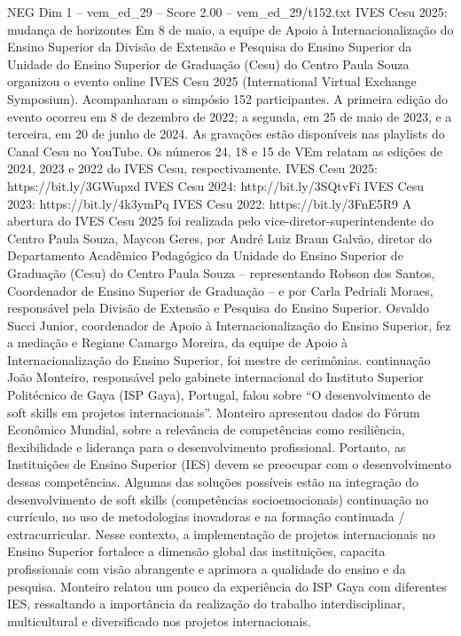 \begin{textsample}{NEG Dim 1 – vem\_ed\_29 – Score 2.00 – vem\_ed\_29/t152.txt}  \label{ex:f1_neg_083}
IVES Cesu 2025: mudança de horizontes Em 8 de maio, a equipe de Apoio à Internacionalização do Ensino Superior da Divisão de Extensão e Pesquisa do Ensino Superior da Unidade do Ensino Superior de Graduação (Cesu) do Centro Paula Souza organizou o evento online IVES Cesu 2025 (International Virtual Exchange Symposium).
Acompanharam o simpósio 152 participantes.
A primeira edição do evento ocorreu em 8 de dezembro de 2022; a segunda, em 25 de maio de 2023, e a terceira, em 20 de junho de 2024.
As gravações estão disponíveis nas playlists do Canal Cesu no YouTube.
Os números 24, 18 e 15 de VEm relatam as edições de 2024, 2023 e 2022 do IVES Cesu, respectivamente.
IVES Cesu 2025: https://bit.ly/3GWupxd IVES Cesu 2024: http://bit.ly/3SQtvFi IVES Cesu 2023: https://bit.ly/4k3ymPq IVES Cesu 2022: https://bit.ly/3FnE5R9 A abertura do IVES Cesu 2025 foi realizada pelo vice-diretor-superintendente do Centro Paula Souza, Maycon Geres, por André Luiz Braun Galvão, diretor do Departamento Acadêmico Pedagógico da Unidade do Ensino Superior de Graduação (Cesu) do Centro Paula Souza – representando Robson dos Santos, Coordenador de Ensino Superior de Graduação – e por Carla Pedriali Moraes, responsável pela Divisão de Extensão e Pesquisa do Ensino Superior.
Osvaldo Succi Junior, coordenador de Apoio à Internacionalização do Ensino Superior, fez a mediação e Regiane Camargo Moreira, da equipe de Apoio à Internacionalização do Ensino Superior, foi mestre de cerimônias. continuação João Monteiro, responsável pelo gabinete internacional do Instituto Superior Politécnico de Gaya (ISP Gaya), Portugal, falou sobre “O desenvolvimento de soft skills em projetos internacionais”.
Monteiro apresentou dados do Fórum Econômico Mundial, sobre a relevância de competências como resiliência, flexibilidade e liderança para o desenvolvimento profissional.
Portanto, as Instituições de Ensino Superior (IES) devem se preocupar com o desenvolvimento dessas competências.
Algumas das soluções possíveis estão na integração do desenvolvimento de soft skills (competências socioemocionais) continuação no currículo, no uso de metodologias inovadoras e na formação continuada / extracurricular.
Nesse contexto, a implementação de projetos internacionais no Ensino Superior fortalece a dimensão global das instituições, capacita profissionais com visão abrangente e aprimora a qualidade do ensino e da pesquisa.
Monteiro relatou um pouco da experiência do ISP Gaya com diferentes IES, ressaltando a importância da realização do trabalho interdisciplinar, multicultural e diversificado nos projetos internacionais.

\end{textsample}
